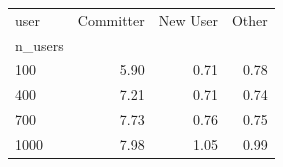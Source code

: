 \begin{tabular}{lrrr}
\toprule
user & Committer & New User & Other \\
n_users &  &  &  \\
\midrule
100 & 5.90 & 0.71 & 0.78 \\
400 & 7.21 & 0.71 & 0.74 \\
700 & 7.73 & 0.76 & 0.75 \\
1000 & 7.98 & 1.05 & 0.99 \\
\bottomrule
\end{tabular}
